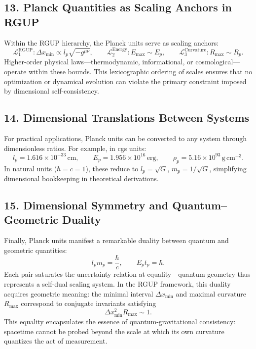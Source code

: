 \documentclass[11pt,oneside]{book}
\numberwithin{equation}{chapter}
\begin{document}
\subsection*{13. Planck Quantities as Scaling Anchors in RGUP}

Within the RGUP hierarchy, the Planck units serve as scaling anchors:
\begin{equation}
\mathcal{L}_1^{\text{RGUP}} : \Delta x_{\min} \propto l_p \sqrt{-g^{\mu\nu}},
\qquad
\mathcal{L}_2^{\text{Energy}} : E_{\max} \sim E_p,
\qquad
\mathcal{L}_3^{\text{Curvature}} : R_{\max} \sim R_p.
\end{equation}
Higher-order physical laws—thermodynamic, informational, or cosmological—operate within these bounds.  
This lexicographic ordering of scales ensures that no optimization or dynamical evolution can violate the primary constraint imposed by dimensional self-consistency.

\subsection*{14. Dimensional Translations Between Systems}

For practical applications, Planck units can be converted to any system through dimensionless ratios.  
For example, in cgs units:
\begin{equation}
l_p = 1.616\times10^{-33}\,\mathrm{cm}, \qquad
E_p = 1.956\times10^{16}\,\mathrm{erg}, \qquad
\rho_p = 5.16\times10^{93}\,\mathrm{g\,cm^{-3}}.
\end{equation}
In natural units ($\hbar=c=1$), these reduce to $l_p = \sqrt{G}$, $m_p = 1/\sqrt{G}$, simplifying dimensional bookkeeping in theoretical derivations.

\subsection*{15. Dimensional Symmetry and Quantum–Geometric Duality}

Finally, Planck units manifest a remarkable duality between quantum and geometric quantities:
\begin{equation}
l_p m_p = \frac{\hbar}{c}, \qquad
E_p t_p = \hbar.
\end{equation}
Each pair saturates the uncertainty relation at equality—quantum geometry thus represents a self-dual scaling system.  
In the RGUP framework, this duality acquires geometric meaning: the minimal interval $\Delta x_{\min}$ and maximal curvature $R_{\max}$ correspond to conjugate invariants satisfying
\begin{equation}
\Delta x_{\min}^2 R_{\max} \sim 1.
\end{equation}
This equality encapsulates the essence of quantum-gravitational consistency: spacetime cannot be probed beyond the scale at which its own curvature quantizes the act of measurement. \vspace{0.8em}
\end{document}
